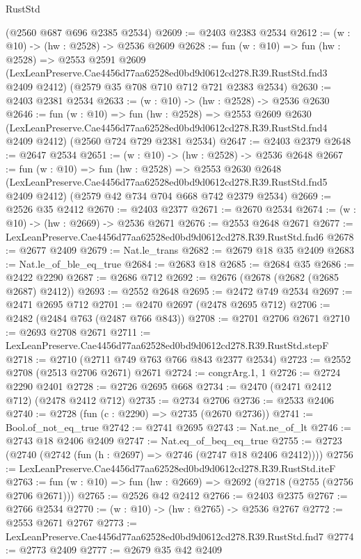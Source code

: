 \begin{lexlean}{RustStd}
\begin{coremodule}
    (@2560 @687 @696 @2385 @2534)
@2609 := @2403 @2383 @2534
@2612 := (w : @10) -> (hw : @2528) -> @2536 @2609
@2628 := fun (w : @10) =>
  fun (hw : @2528) =>
  @2553
    @2591
    @2609
    (LexLeanPreserve.Cae4456d77aa62528ed0bd9d0612cd278.R39.RustStd.fnd3 @2409 @2412)
    (@2579 @35 @708 @710 @712 @721 @2383 @2534)
@2630 := @2403 @2381 @2534
@2633 := (w : @10) -> (hw : @2528) -> @2536 @2630
@2646 := fun (w : @10) =>
  fun (hw : @2528) =>
  @2553
    @2609
    @2630
    (LexLeanPreserve.Cae4456d77aa62528ed0bd9d0612cd278.R39.RustStd.fnd4 @2409 @2412)
    (@2560 @724 @729 @2381 @2534)
@2647 := @2403 @2379
@2648 := @2647 @2534
@2651 := (w : @10) -> (hw : @2528) -> @2536 @2648
@2667 := fun (w : @10) =>
  fun (hw : @2528) =>
  @2553
    @2630
    @2648
    (LexLeanPreserve.Cae4456d77aa62528ed0bd9d0612cd278.R39.RustStd.fnd5 @2409 @2412)
    (@2579 @42 @734 @704 @668 @742 @2379 @2534)
@2669 := @2526 @35 @2412
@2670 := @2403 @2377
@2671 := @2670 @2534
@2674 := (w : @10) -> (hw : @2669) -> @2536 @2671
@2676 := @2553 @2648 @2671
@2677 := LexLeanPreserve.Cae4456d77aa62528ed0bd9d0612cd278.R39.RustStd.fnd6
@2678 := @2677 @2409
@2679 := Nat.le_trans
@2682 := @2679 @18 @35 @2409
@2683 := Nat.le_of_ble_eq_true
@2684 := @2683 @18
@2685 := @2684 @35
@2686 := @2422 @2290
@2687 := @2686 @712
@2692 := @2676 (@2678 (@2682 (@2685 @2687) @2412))
@2693 := @2552 @2648
@2695 := @2472 @749 @2534
@2697 := @2471 @2695 @712
@2701 := @2470 @2697 (@2478 @2695 @712)
@2706 := @2482 (@2484 @763 (@2487 @766 @843))
@2708 := @2701 @2706 @2671
@2710 := @2693 @2708 @2671
@2711 := LexLeanPreserve.Cae4456d77aa62528ed0bd9d0612cd278.R39.RustStd.stepF
@2718 := @2710 (@2711 @749 @763 @766 @843 @2377 @2534)
@2723 := @2552 @2708 (@2513 @2706 @2671) @2671
@2724 := congrArg.{1, 1}
@2726 := @2724 @2290 @2401
@2728 := @2726 @2695 @668
@2734 := @2470 (@2471 @2412 @712) (@2478 @2412 @712)
@2735 := @2734 @2706
@2736 := @2533 @2406
@2740 := @2728 (fun (c : @2290) => @2735 (@2670 @2736))
@2741 := Bool.of_not_eq_true
@2742 := @2741 @2695
@2743 := Nat.ne_of_lt
@2746 := @2743 @18 @2406 @2409
@2747 := Nat.eq_of_beq_eq_true
@2755 := @2723 (@2740 (@2742 (fun (h : @2697) => @2746 (@2747 @18 @2406 @2412))))
@2756 := LexLeanPreserve.Cae4456d77aa62528ed0bd9d0612cd278.R39.RustStd.iteF
@2763 := fun (w : @10) => fun (hw : @2669) => @2692 (@2718 (@2755 (@2756 @2706 @2671)))
@2765 := @2526 @42 @2412
@2766 := @2403 @2375
@2767 := @2766 @2534
@2770 := (w : @10) -> (hw : @2765) -> @2536 @2767
@2772 := @2553 @2671 @2767
@2773 := LexLeanPreserve.Cae4456d77aa62528ed0bd9d0612cd278.R39.RustStd.fnd7
@2774 := @2773 @2409
@2777 := @2679 @35 @42 @2409

\end{coremodule}
\end{lexlean}
